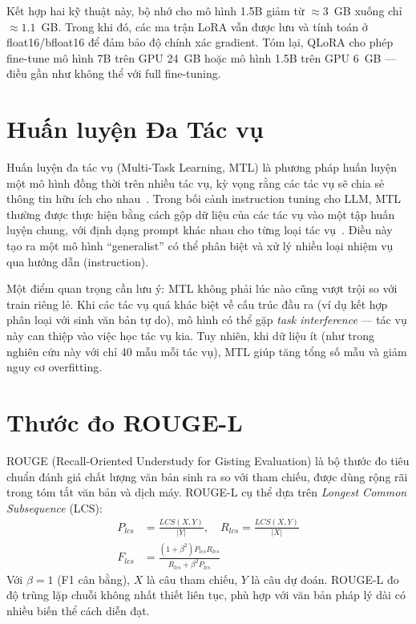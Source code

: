 \documentclass[fontsize=13pt,a4paper,oneside,DIV=calc,chapterprefix=true]{scrbook}
\begin{document}
Kết hợp hai kỹ thuật này, bộ nhớ cho mô hình 1.5B giảm từ $\approx 3$~GB xuống chỉ
$\approx 1.1$~GB. Trong khi đó, các ma trận LoRA vẫn được lưu và tính toán ở float16/bfloat16
để đảm bảo độ chính xác gradient. Tóm lại, QLoRA cho phép fine-tune mô hình 7B trên GPU 24~GB
hoặc mô hình 1.5B trên GPU 6~GB --- điều gần như không thể với full fine-tuning.

\section{Huấn luyện Đa Tác vụ}

Huấn luyện đa tác vụ (Multi-Task Learning, MTL) là phương pháp huấn luyện một mô hình đồng
thời trên nhiều tác vụ, kỳ vọng rằng các tác vụ sẽ chia sẻ thông tin hữu ích cho nhau~\cite{mtl_survey}.
Trong bối cảnh instruction tuning cho LLM, MTL thường được thực hiện bằng cách gộp dữ liệu
của các tác vụ vào một tập huấn luyện chung, với định dạng prompt khác nhau cho từng loại tác
vụ~\cite{flan2022}. Điều này tạo ra một mô hình ``generalist'' có thể phân biệt và xử lý
nhiều loại nhiệm vụ qua hướng dẫn (instruction).

Một điểm quan trọng cần lưu ý: MTL không phải lúc nào cũng vượt trội so với train riêng lẻ.
Khi các tác vụ quá khác biệt về cấu trúc đầu ra (ví dụ kết hợp phân loại với sinh văn bản
tự do), mô hình có thể gặp \textit{task interference} --- tác vụ này can thiệp vào việc học
tác vụ kia. Tuy nhiên, khi dữ liệu ít (như trong nghiên cứu này với chỉ 40 mẫu mỗi tác vụ),
MTL giúp tăng tổng số mẫu và giảm nguy cơ overfitting.

\section{Thước đo ROUGE-L}

ROUGE (Recall-Oriented Understudy for Gisting Evaluation) là bộ thước đo tiêu chuẩn đánh giá
chất lượng văn bản sinh ra so với tham chiếu, được dùng rộng rãi trong tóm tắt văn bản và
dịch máy. ROUGE-L cụ thể dựa trên \textit{Longest Common Subsequence} (LCS):
\begin{align}
  P_{lcs} &= \frac{LCS(X,Y)}{|Y|}, \quad
  R_{lcs} = \frac{LCS(X,Y)}{|X|} \\
  F_{lcs} &= \frac{(1+\beta^2) P_{lcs} R_{lcs}}{R_{lcs} + \beta^2 P_{lcs}}
\end{align}
Với $\beta = 1$ (F1 cân bằng), $X$ là câu tham chiếu, $Y$ là câu dự đoán. ROUGE-L đo độ
trùng lặp chuỗi không nhất thiết liên tục, phù hợp với văn bản pháp lý dài có nhiều biến thể
cách diễn đạt.
\end{document}
